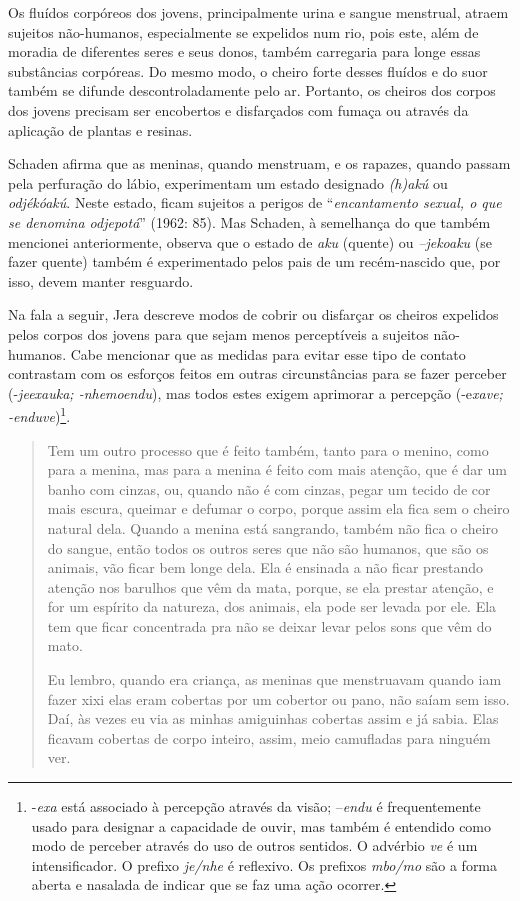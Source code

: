 Os fluídos corpóreos dos jovens, principalmente urina e sangue
menstrual, atraem sujeitos não-humanos, especialmente se expelidos num
rio, pois este, além de moradia de diferentes seres e seus donos, também
carregaria para longe essas substâncias corpóreas. Do mesmo modo, o
cheiro forte desses fluídos e do suor também se difunde
descontroladamente pelo ar. Portanto, os cheiros dos corpos dos jovens
precisam ser encobertos e disfarçados com fumaça ou através da aplicação
de plantas e resinas.

Schaden afirma que as meninas, quando menstruam, e os rapazes, quando
passam pela perfuração do lábio, experimentam um estado designado
\emph{(h)akú} ou \emph{odjékóakú}. Neste estado, ficam sujeitos a
perigos de ``\emph{encantamento sexual, o que se denomina odjepotá}''
(1962: 85). Mas Schaden, à semelhança do que também mencionei
anteriormente, observa que o estado de \emph{aku} (quente) ou
\emph{--jekoaku} (se fazer quente) também é experimentado pelos pais de
um recém-nascido que, por isso, devem manter resguardo.

Na fala a seguir, Jera descreve modos de cobrir ou disfarçar os cheiros
expelidos pelos corpos dos jovens para que sejam menos perceptíveis a
sujeitos não-humanos. Cabe mencionar que as medidas para evitar esse
tipo de contato contrastam com os esforços feitos em outras
circunstâncias para se fazer perceber (-\emph{jeexauka; -nhemoendu}),
mas todos estes exigem aprimorar a percepção (-e\emph{xave;
-enduve})\footnote{-\emph{exa} está associado à percepção através da
  visão; --\emph{endu} é frequentemente usado para designar a capacidade
  de ouvir, mas também é entendido como modo de perceber através do uso
  de outros sentidos. O advérbio \emph{ve} é um intensificador. O
  prefixo \emph{je/nhe} é reflexivo. Os prefixos \emph{mbo/mo} são a
  forma aberta e nasalada de indicar que se faz uma ação ocorrer.}.

\begin{quote}
Tem um outro processo que é feito também, tanto para o menino, como para
a menina, mas para a menina é feito com mais atenção, que é dar um banho
com cinzas, ou, quando não é com cinzas, pegar um tecido de cor mais
escura, queimar e defumar o corpo, porque assim ela fica sem o cheiro
natural dela. Quando a menina está sangrando, também não fica o cheiro
do sangue, então todos os outros seres que não são humanos, que são os
animais, vão ficar bem longe dela. Ela é ensinada a não ficar prestando
atenção nos barulhos que vêm da mata, porque, se ela prestar atenção, e
for um espírito da natureza, dos animais, ela pode ser levada por ele.
Ela tem que ficar concentrada pra não se deixar levar pelos sons que vêm
do mato.

Eu lembro, quando era criança, as meninas que menstruavam quando iam
fazer xixi elas eram cobertas por um cobertor ou pano, não saíam sem
isso. Daí, às vezes eu via as minhas amiguinhas cobertas assim e já
sabia. Elas ficavam cobertas de corpo inteiro, assim, meio camufladas
para ninguém ver.
\end{quote}

